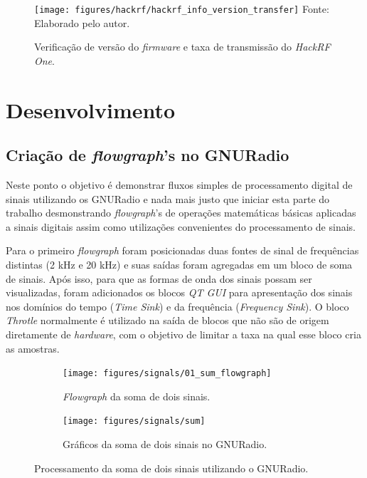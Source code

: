 \documentclass[
  12pt,				%
  openright,			%
  twoside,			%
  a4paper,			%
  english,			%
  french,				%
  spanish,			%
  brazil,				%
  ]{abntex2}
\begin{document}
\begin{figure}[!htb]
  \centering
  \caption{Verificação de versão do \textit{firmware} e taxa de transmissão do \textit{HackRF One}.}
  \texttt{[image: figures/hackrf/hackrf\_info\_version\_transfer]}
  Fonte: Elaborado pelo autor.
  \label{fig:hackrf_info}
\end{figure}
\part{Desenvolvimento}

\chapter{Criação de \textit{flowgraph}'s no GNURadio} \label{chapter:flowgraphs}

Neste ponto o objetivo é demonstrar fluxos simples de processamento digital de sinais utilizando os GNURadio e nada mais justo que iniciar esta parte
do trabalho desmonstrando \textit{flowgraph}'s de operações matemáticas básicas aplicadas a sinais digitais assim como utilizações convenientes do processamento de sinais.

Para o primeiro \textit{flowgraph} foram posicionadas duas fontes de sinal de frequências distintas (2 kHz e 20 kHz) e suas saídas foram agregadas em um bloco de soma de sinais. Após isso,
para que as formas de onda dos sinais possam ser visualizadas, foram adicionados os blocos \textit{QT GUI} para apresentação dos sinais nos domínios do tempo
(\textit{Time Sink}) e da frequência (\textit{Frequency Sink}). O bloco \textit{Throtle} normalmente é utilizado na saída de blocos que não são de origem
diretamente de \textit{hardware}, com o objetivo de limitar a taxa na qual esse bloco cria as amostras.

\begin{figure}[!htb]
  \centering
  \begin{subfigure}[b]{0.8\linewidth}
    \centering
    \caption{\textit{Flowgraph} da soma de dois sinais.}
    \texttt{[image: figures/signals/01\_sum\_flowgraph]}
    \label{fig:gnuradio_sum_flowgraph}
  \end{subfigure}

  \begin{subfigure}[b]{0.8\linewidth}
    \centering
    \caption{Gráficos da soma de dois sinais no GNURadio.}
    \texttt{[image: figures/signals/sum]}
    \label{fig:gnuradio_sum}
  \end{subfigure}
  \caption{Processamento da soma de dois sinais utilizando o GNURadio.}
  \label{fig:gnuradio_signals_sum}
\end{figure}
\end{document}
